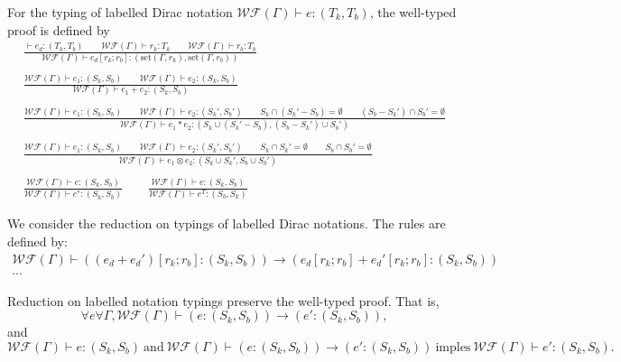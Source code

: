 \begin{definition}
  For the typing of labelled Dirac notation $\mathcal{WF}(\Gamma) \vdash e : (T_k, T_b)$, the well-typed proof is defined by
  \begin{gather*}
    \frac{\vdash e_d : (T_k, T_b) \qquad \mathcal{WF}(\Gamma) \vdash r_k : T_k \qquad \mathcal{WF}(\Gamma) \vdash r_b : T_b}{\mathcal{WF}(\Gamma) \vdash e_d[r_k; r_b] : (\mathrm{set}(\Gamma, r_k), \mathrm{set}(\Gamma, r_b))}\\
    \ \\
    \frac{\mathcal{WF}(\Gamma) \vdash e_1 : (S_k, S_b) \qquad \mathcal{WF}(\Gamma) \vdash e_2 : (S_k, S_b)}{\mathcal{WF}(\Gamma) \vdash e_1 + e_2 : (S_k, S_b)}\\
    \ \\
    \frac{\mathcal{WF}(\Gamma) \vdash e_1 : (S_k, S_b) \qquad \mathcal{WF}(\Gamma) \vdash e_2 : (S_k', S_b')
    \qquad S_k \cap (S_k' - S_b) = \emptyset
    \qquad (S_b - S_k') \cap S_b' = \emptyset}
    {\mathcal{WF}(\Gamma) \vdash e_1 * e_2 : (S_k \cup (S_k' - S_b), (S_b - S_k') \cup S_b')}\\
    \ \\
    \frac{\mathcal{WF}(\Gamma) \vdash e_1 : (S_k, S_b) \qquad \mathcal{WF}(\Gamma) \vdash e_2 : (S_k', S_b')
    \qquad S_k \cap S_k' = \emptyset
    \qquad S_b \cap S_b' = \emptyset}
    {\mathcal{WF}(\Gamma) \vdash e_1 \otimes e_2 : (S_k \cup S_k', S_b \cup S_b')}\\
    \ \\
    \frac{\mathcal{WF}(\Gamma) \vdash e : (S_k, S_b)}{\mathcal{WF}(\Gamma) \vdash e^* : (S_k, S_b)}
    \qquad
    \frac{\mathcal{WF}(\Gamma) \vdash e : (S_k, S_b)}{\mathcal{WF}(\Gamma) \vdash e^T : (S_b, S_k)}
  \end{gather*}
\end{definition}

\begin{definition}
  We consider the reduction on typings of labelled Dirac notations. The rules are defined by:
  \begin{gather*}
    \mathcal{WF}(\Gamma) \vdash ((e_d + e_d')[r_k; r_b]: (S_k, S_b)) \to (e_d[r_k; r_b] + e_d'[r_k; r_b] : (S_k, S_b))\\
    \cdots
  \end{gather*}
\end{definition}

\begin{claim}
  Reduction on labelled notation typings preserve the well-typed proof. That is,
  $$
  \forall e \forall \Gamma, \mathcal{WF}(\Gamma) \vdash (e : (S_k, S_b)) \to (e' : (S_k, S_b)),
  $$
  and
  $$
  \mathcal{WF}(\Gamma) \vdash e : (S_k, S_b)\ \textrm{and}\ \mathcal{WF}(\Gamma) \vdash (e : (S_k, S_b)) \to (e' : (S_k, S_b))\ \textrm{imples}\ \mathcal{WF}(\Gamma) \vdash e' : (S_k, S_b).
  $$
\end{claim}


